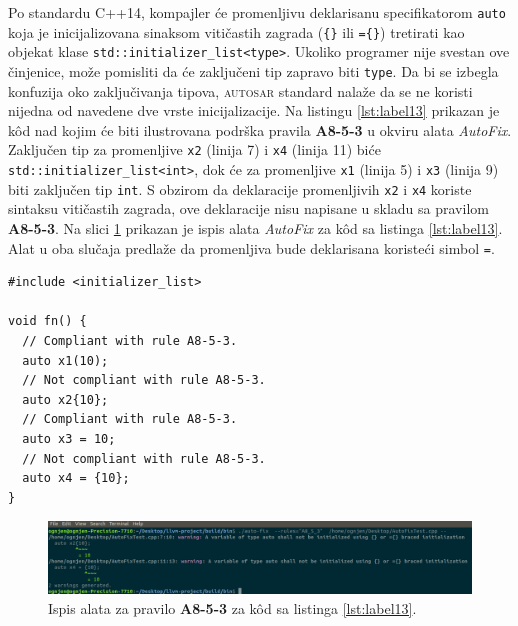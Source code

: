 \documentclass[12pt,oneside]{memoir}
\begin{document}
Po standardu C++14, kompajler \'{c}e  promenljivu deklarisanu specifikatorom \texttt{auto} koja je inicijalizovana sinaksom viti\v{c}astih zagrada (\texttt{\{\}} ili \texttt{=\{\}}) tretirati kao objekat klase
\texttt{std::initializer\_list<type>}. Ukoliko programer nije svestan ove \v{c}injenice, mo\v{z}e pomisliti da \'{c}e zaklju\v{c}eni tip zapravo biti \texttt{type}. Da bi se izbegla konfuzija oko zaklju\v{c}ivanja
tipova, \textsc{autosar} standard nala\v{z}e da se ne koristi nijedna od navedene dve vrste inicijalizacije.
Na listingu \ref{lst:label13} prikazan je k\^{o}d nad kojim \'{c}e biti ilustrovana podr\v{s}ka pravila \textbf{A8-5-3} u okviru alata \textit{AutoFix}. 
Zaklju\v{c}en tip za promenljive \texttt{x2} (linija 7) i \texttt{x4} (linija 11) bi\'c{e} \texttt{std::initializer\_list<int>}, dok \'{c}e za promenljive \texttt{x1} (linija 5) i \texttt{x3} (linija 9) biti zaklju\v{c}en tip \texttt{int}. S obzirom da deklaracije promenljivih \texttt{x2} i \texttt{x4} koriste sintaksu
viti\v{c}astih zagrada, ove deklaracije nisu napisane u skladu sa pravilom \textbf{A8-5-3}.
Na slici \ref{fig:A8-5-3} prikazan je ispis alata \textit{AutoFix} za k\^{o}d sa listinga \ref{lst:label13}. Alat u oba slu\v{c}aja predla\v{z}e
da promenljiva bude deklarisana koriste\'{c}i simbol \texttt{=}.

\begin{lstlisting}[style=customc, caption={K\^{o}d nad kojim je demonstrirana podr\v{s}ka pravila \textbf{A8-5-3} u okviru alata \textit{AutoFix} za . Ispis alata \textit{AutoFix} nakon pokretanja nad ovim kodom prikazan je na slici \ref{fig:A8-5-3}.}, label=lst:label13]
#include <initializer_list>

void fn() {
  // Compliant with rule A8-5-3.
  auto x1(10);
  // Not compliant with rule A8-5-3.
  auto x2{10};
  // Compliant with rule A8-5-3.
  auto x3 = 10;
  // Not compliant with rule A8-5-3.
  auto x4 = {10};
}

\end{lstlisting}

\begin{figure}[!h]
\begin{center}
\includegraphics[scale=0.3]{A8_5_3.png}
\end{center}
\caption{Ispis alata za pravilo \textbf{A8-5-3} za k\^{o}d sa listinga \ref{lst:label13}.}
\label{fig:A8-5-3}
\end{figure}
\end{document}
